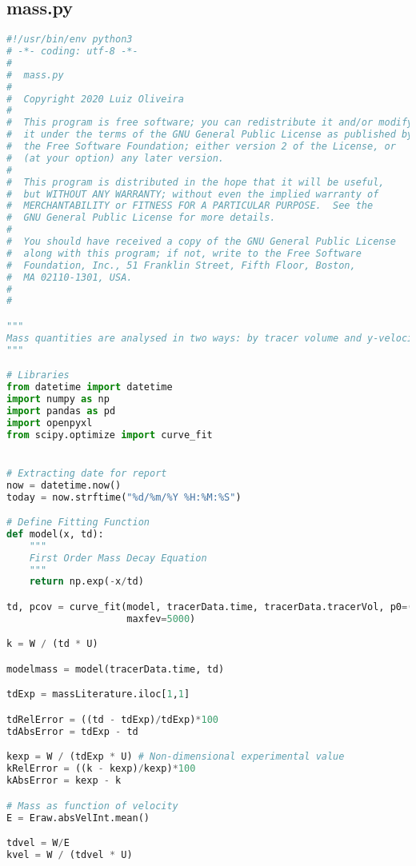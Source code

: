 \subsection{mass.py}
\begin{lstlisting}[language=python]
#!/usr/bin/env python3
# -*- coding: utf-8 -*-
#
#  mass.py
#  
#  Copyright 2020 Luiz Oliveira
#  
#  This program is free software; you can redistribute it and/or modify
#  it under the terms of the GNU General Public License as published by
#  the Free Software Foundation; either version 2 of the License, or
#  (at your option) any later version.
#  
#  This program is distributed in the hope that it will be useful,
#  but WITHOUT ANY WARRANTY; without even the implied warranty of
#  MERCHANTABILITY or FITNESS FOR A PARTICULAR PURPOSE.  See the
#  GNU General Public License for more details.
#  
#  You should have received a copy of the GNU General Public License
#  along with this program; if not, write to the Free Software
#  Foundation, Inc., 51 Franklin Street, Fifth Floor, Boston,
#  MA 02110-1301, USA.
#  
#  

"""
Mass quantities are analysed in two ways: by tracer volume and y-velocity
"""

# Libraries
from datetime import datetime
import numpy as np
import pandas as pd
import openpyxl
from scipy.optimize import curve_fit


# Extracting date for report
now = datetime.now()
today = now.strftime("%d/%m/%Y %H:%M:%S")

# Define Fitting Function
def model(x, td):
    """
    First Order Mass Decay Equation
    """
    return np.exp(-x/td)

td, pcov = curve_fit(model, tracerData.time, tracerData.tracerVol, p0=(40),
                     maxfev=5000)

k = W / (td * U)

modelmass = model(tracerData.time, td)

tdExp = massLiterature.iloc[1,1]

tdRelError = ((td - tdExp)/tdExp)*100
tdAbsError = tdExp - td

kexp = W / (tdExp * U) # Non-dimensional experimental value
kRelError = ((k - kexp)/kexp)*100
kAbsError = kexp - k

# Mass as function of velocity
E = Eraw.absVelInt.mean()

tdvel = W/E
kvel = W / (tdvel * U)


\end{lstlisting}
